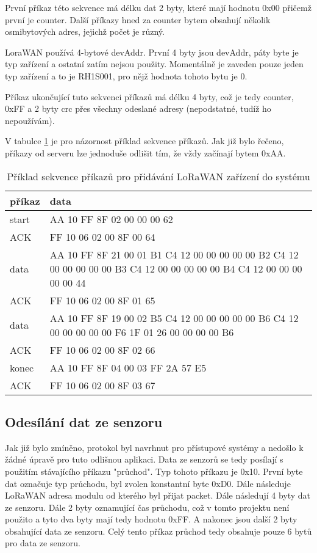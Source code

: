 První příkaz této sekvence má délku dat 2 byty, které mají hodnotu 0x00 přičemž první je counter.
Další příkazy hned za counter bytem obsahují několik osmibytových adres, jejichž počet je různý.

LoraWAN používá 4-bytové devAddr. První 4 byty jsou devAddr, páty byte je typ zařízení a ostatní zatím nejsou použity. Momentálně je zaveden pouze jeden typ zařízení a to je RH1S001, pro nějž hodnota tohoto bytu je 0.

Příkaz ukončující tuto sekvenci příkazů má délku 4 byty, což je tedy counter, 0xFF a 2 byty crc přes všechny odeslané adresy (nepodstatné, tudíž ho nepoužívám).

V tabulce \ref{table:2} je pro názornost příklad sekvence příkazů. Jak již bylo řečeno, příkazy od serveru lze jednoduše odlišit tím, že vždy začínají bytem 0xAA.

\begin{table}[!h]
    \begin{tabular}{ |l|p{10cm}| }
    \hline
    příkaz      &  data    \\ \hline \hline
    start      &  AA 10 FF 8F 02 00 00 00 62    \\ \hline
    ACK        &  FF 10 06 02 00 8F 00 64    \\ \hline
    data     &  AA 10 FF 8F 21 00 01 B1 C4 12 00 00 00 00 00 B2 C4 12 00 00 00 00 00 B3 C4 12 00 00 00 00 00 B4 C4 12 00 00 00 00 00 44 \\ \hline
    ACK      &  FF 10 06 02 00 8F 01 65   \\ \hline
    data     &  AA 10 FF 8F 19 00 02 B5 C4 12 00 00 00 00 00 B6 C4 12 00 00 00 00 00 F6 1F 01 26 00 00 00 00 B6 \\ \hline
    ACK      &   FF 10 06 02 00 8F 02 66   \\ \hline
    konec      &   AA 10 FF 8F 04 00 03 FF 2A 57 E5   \\ \hline
    ACK      &   FF 10 06 02 00 8F 03 67  \\ \hline
    \end{tabular}
    \caption{Příklad sekvence příkazů pro přidávání LoRaWAN zařízení do systému}
    \label{table:2}
\end{table}


\subsection{Odesílání dat ze senzoru}
Jak již bylo zmíněno, protokol byl navrhnut pro přístupové systémy a nedošlo k žádné úpravě pro tuto odlišnou aplikaci. Data ze senzorů se tedy posílají s použitím stávajícího příkazu "průchod".
Typ tohoto příkazu je 0x10. První byte dat označuje typ průchodu, byl zvolen konstantní byte 0xD0.
Dále následuje LoRaWAN adresa modulu od kterého byl přijat packet. Dále následují 4 byty dat ze senzoru. Dále 2 byty oznamující čas průchodu, což v tomto projektu není použito a tyto dva byty mají tedy hodnotu 0xFF. A nakonec jsou další 2 byty obsahující data ze senzoru.
Celý tento příkaz průchod tedy obsahuje pouze 6 bytů pro data ze senzoru.

